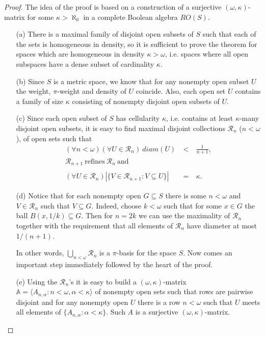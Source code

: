 \begin{proof}
The idea of the proof is based on a construction of a surjective
$(\omega,\kappa)$-matrix for some $\kappa > \aleph_0$ in a
complete Boolean algebra $RO(S)$.
\begin{itemize}
\item[(a)]  There is a maximal family of disjoint open subsets of $S$ such that each of the sets is homogeneous in density, so it is sufficient
to prove the theorem for spaces which are homogeneous in density $\kappa>\omega$, i.e. spaces where all open subspaces have a dense subset of cardinality $\kappa$.
\item[(b)]  Since $S$ is a metric space, we know that for any nonempty open subset $U$ the weight, $\pi$-weight and density of $U$ coincide. Also,
each open set $U$ contains a family of size $\kappa$ consisting of nonempty disjoint open subsets of $U$.

\item[(c)] Since each open subset of $S$ has cellularity $\kappa$, i.e. contains at least $\kappa$-many disjoint open subsets, it is easy to find maximal disjoint collections ${\mathcal R}_n$ ($n<\omega$),
of open sets such that
\begin{eqnarray*}
(\forall n<\omega)(\forall U\in {\mathcal R}_n)\ diam(U) \ & < & \ \frac{1}{n+1}, \\
{\mathcal R}_{n+1} \ \mbox{refines} \ {\mathcal R}_{n} \ \mbox{and} \qquad & {\dfrac{{}}{{}}} & \\
(\forall U\in {\mathcal R}_n)|\{V\in {\mathcal R}_{n+1}:V\subseteq U\}| \ & = & \ \kappa.
 \end{eqnarray*}
\item[(d)] Notice that for each nonempty open $G\subseteq S$ there is some $n<\omega$ and $V\in{\mathcal R}_n$ such that $V\subseteq G$. Indeed, choose $k<\omega$
such that for some $x\in G$ the ball $B(x,1/k)\subseteq G$. Then for $n=2k$ we can use the maximality of ${\mathcal R}_n$ together with the requirement that
all elements of ${\mathcal R}_n$ have diameter at most $1/(n+1)$.

In  other words, $\bigcup_{n<\omega} {\mathcal R}_n$ is a $\pi$-basis for the space $S$. Now comes an important step immediately followed by the heart of
the proof.

\item[(e)]  Using the ${\mathcal R}_n$'s it is easy to build a $(\omega,\kappa)$-matrix ${\mathbb A}=\langle A_{n,\alpha}:n<\omega,\alpha<\kappa\rangle$ of nonempty open sets such that rows are pairwise disjoint and for any nonempty open $U$ there is a row $n<\omega$ such that $U$ meets all elements of $\{A_{n,\alpha}:\alpha<\kappa\}$. Such $A$ is
a surjective $(\omega,\kappa)$-matrix.


\end{itemize}
\end{proof}

